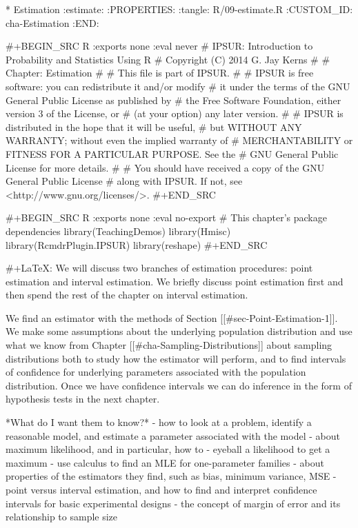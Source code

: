 * Estimation                                                       :estimate:
:PROPERTIES:
:tangle: R/09-estimate.R
:CUSTOM_ID: cha-Estimation
:END:

#+BEGIN_SRC R :exports none :eval never
#    IPSUR: Introduction to Probability and Statistics Using R
#    Copyright (C) 2014  G. Jay Kerns
#
#    Chapter: Estimation
#
#    This file is part of IPSUR.
#
#    IPSUR is free software: you can redistribute it and/or modify
#    it under the terms of the GNU General Public License as published by
#    the Free Software Foundation, either version 3 of the License, or
#    (at your option) any later version.
#
#    IPSUR is distributed in the hope that it will be useful,
#    but WITHOUT ANY WARRANTY; without even the implied warranty of
#    MERCHANTABILITY or FITNESS FOR A PARTICULAR PURPOSE.  See the
#    GNU General Public License for more details.
#
#    You should have received a copy of the GNU General Public License
#    along with IPSUR.  If not, see <http://www.gnu.org/licenses/>.
#+END_SRC

#+BEGIN_SRC R :exports none :eval no-export
# This chapter's package dependencies
library(TeachingDemos)
library(Hmisc)
library(RcmdrPlugin.IPSUR)
library(reshape)
#+END_SRC

#+LaTeX: \noindent 
We will discuss two branches of estimation procedures: point
estimation and interval estimation. We briefly discuss point
estimation first and then spend the rest of the chapter on interval
estimation.

We find an estimator with the methods of Section
[[#sec-Point-Estimation-1]]. We make some assumptions about the
underlying population distribution and use what we know from Chapter
[[#cha-Sampling-Distributions]] about sampling
distributions both to study how the estimator will perform, and to
find intervals of confidence for underlying parameters associated with
the population distribution. Once we have confidence intervals we can
do inference in the form of hypothesis tests in the next chapter.

*What do I want them to know?*
- how to look at a problem, identify a reasonable model, and estimate
  a parameter associated with the model
- about maximum likelihood, and in particular, how to
   - eyeball a likelihood to get a maximum
   - use calculus to find an MLE for one-parameter families
- about properties of the estimators they find, such as bias, minimum
  variance, MSE
- point versus interval estimation, and how to find and interpret
  confidence intervals for basic experimental designs
- the concept of margin of error and its relationship to sample size

